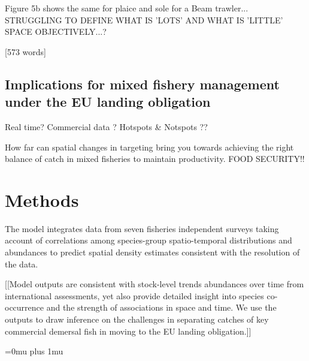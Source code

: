 \documentclass{nature}
\begin{document}
\begin{linenumbers}
Figure 5b shows the same for plaice and sole for a Beam trawler...
STRUGGLING TO DEFINE WHAT IS 'LOTS' AND WHAT IS 'LITTLE' SPACE OBJECTIVELY...?

[573 words]

\subsection{Implications for mixed fishery management under the EU landing
	obligation}


Real time?  Commercial data ?  Hotspots \& Notspots ??

How far can spatial changes in targeting bring you towards achieving the right
balance of catch in mixed fisheries to maintain productivity. FOOD SECURITY!!

\section*{Methods}



The model integrates data from seven fisheries independent surveys taking
account of correlations among species-group spatio-temporal distributions and
abundances to predict spatial density estimates consistent with the resolution
of the data. 

[[Model outputs are consistent with stock-level trends abundances over time
from international assessments, yet also provide detailed insight into species
co-occurrence and the strength of associations in space and time.  We use the
outputs to draw inference on the challenges in separating catches of key
commercial demersal fish in moving to the EU landing obligation.]]



\end{linenumbers}
\newpage
\Urlmuskip=0mu plus 1mu\relax

\small{}



\end{document}
